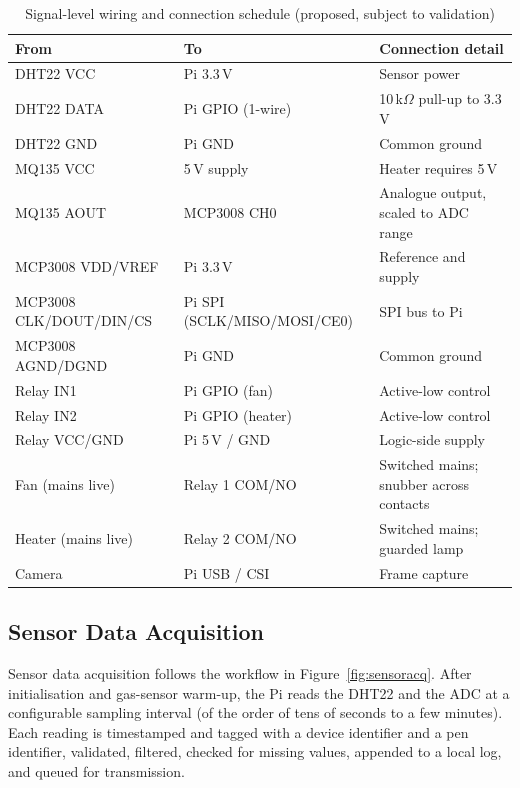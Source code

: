 \documentclass[12pt,a4paper]{report}
\begin{document}
\begin{table}[tbp]
\caption{Signal-level wiring and connection schedule (proposed, subject to validation)}
\label{tab:wiring}
\centering
\footnotesize
\renewcommand{\arraystretch}{1.2}
\begin{tabularx}{\textwidth}{|l|l|X|}
\hline
\rowcolor{headerblue}
\textbf{From} & \textbf{To} & \textbf{Connection detail} \\
\hline
DHT22 VCC & Pi 3.3\,V & Sensor power \\
\hline
DHT22 DATA & Pi GPIO (1-wire) & 10\,k$\Omega$ pull-up to 3.3\,V \\
\hline
DHT22 GND & Pi GND & Common ground \\
\hline
MQ135 VCC & 5\,V supply & Heater requires 5\,V \\
\hline
MQ135 AOUT & MCP3008 CH0 & Analogue output, scaled to ADC range \\
\hline
MCP3008 VDD/VREF & Pi 3.3\,V & Reference and supply \\
\hline
MCP3008 CLK/DOUT/DIN/CS & Pi SPI (SCLK/MISO/MOSI/CE0) & SPI bus to Pi \\
\hline
MCP3008 AGND/DGND & Pi GND & Common ground \\
\hline
Relay IN1 & Pi GPIO (fan) & Active-low control \\
\hline
Relay IN2 & Pi GPIO (heater) & Active-low control \\
\hline
Relay VCC/GND & Pi 5\,V / GND & Logic-side supply \\
\hline
Fan (mains live) & Relay 1 COM/NO & Switched mains; snubber across contacts \\
\hline
Heater (mains live) & Relay 2 COM/NO & Switched mains; guarded lamp \\
\hline
Camera & Pi USB / CSI & Frame capture \\
\hline
\end{tabularx}
\end{table}

\subsection{Sensor Data Acquisition}

Sensor data acquisition follows the workflow in Figure~\ref{fig:sensoracq}. After initialisation and gas-sensor warm-up, the Pi reads the DHT22 and the ADC at a configurable sampling interval (of the order of tens of seconds to a few minutes). Each reading is timestamped and tagged with a device identifier and a pen identifier, validated, filtered, checked for missing values, appended to a local log, and queued for transmission.
\end{document}
